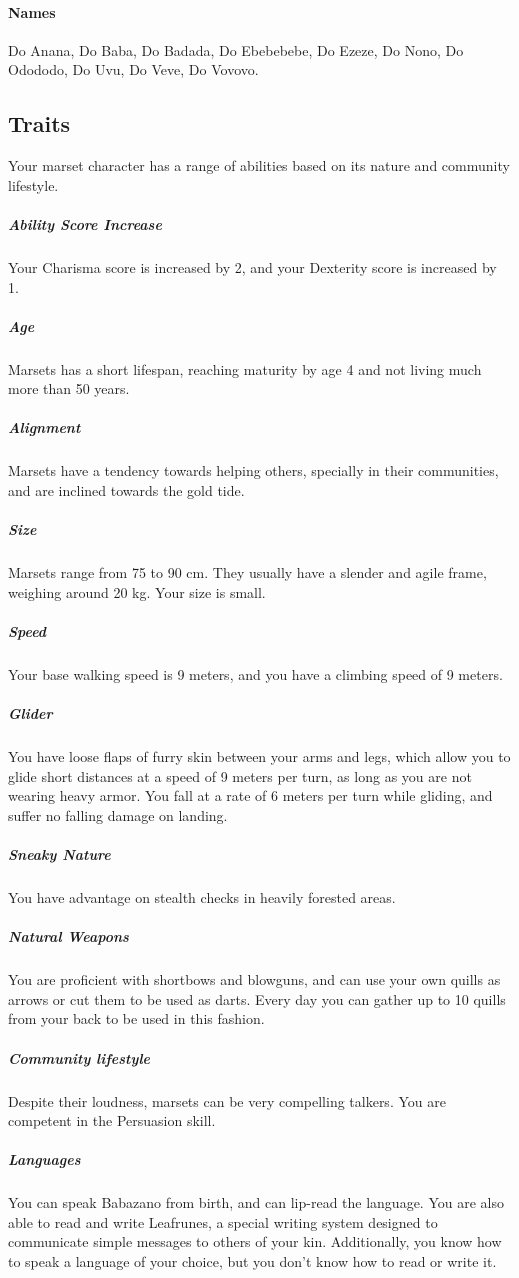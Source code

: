     \paragraph{Names}
    Do Anana, Do Baba, Do Badada, Do Ebebebebe, Do Ezeze, Do Nono, Do Odododo, Do Uvu, Do Veve, Do Vovovo.

\subsection*{Traits}
    Your marset character has a range of abilities based on its nature and community lifestyle.

    \subparagraph{Ability Score Increase} Your Charisma score is increased by 2, and your Dexterity score is increased by 1.

    \subparagraph{Age} Marsets has a short lifespan, reaching maturity by age 4 and not living much more than 50 years.

    \subparagraph{Alignment} Marsets have a tendency towards helping others, specially in their communities, and are inclined towards the gold tide.

    \subparagraph{Size} Marsets range from 75 to 90 cm.
    They usually have a slender and agile frame, weighing around 20 kg.
    Your size is small.

    \subparagraph{Speed} Your base walking speed is 9 meters, and you have a climbing speed of 9 meters.

    \subparagraph{Glider} You have loose flaps of furry skin between your arms and legs, which allow you to glide short distances at a speed of 9 meters per turn, as long as you are not wearing heavy armor.
    You fall at a rate of 6 meters per turn while gliding, and suffer no falling damage on landing.

    \subparagraph{Sneaky Nature} You have advantage on stealth checks in heavily forested areas.

    \subparagraph{Natural Weapons} You are proficient with shortbows and blowguns, and can use your own quills as arrows or cut them to be used as darts.
    Every day you can gather up to 10 quills from your back to be used in this fashion.

    \subparagraph{Community lifestyle} Despite their loudness, marsets can be very compelling talkers.
    You are competent in the Persuasion skill.

    \subparagraph{Languages} You can speak Babazano from birth, and can lip-read the language.
    You are also able to read and write Leafrunes, a special writing system designed to communicate simple messages to others of your kin.
    Additionally, you know how to speak a language of your choice, but you don't know how to read or write it.

